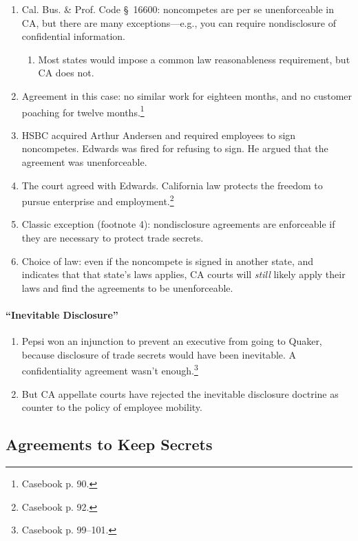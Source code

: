 \begin{enumerate}
    \item Cal. Bus. \& Prof. Code \S\ 16600: noncompetes are per se 
    unenforceable in CA, but there are many exceptions---e.g., you can require 
    nondisclosure of confidential information.
    \begin{enumerate}
        \item Most states would impose a common law reasonableness 
        requirement, but CA does not.
    \end{enumerate}
    \item Agreement in this case: no similar work for eighteen months, and no 
    customer poaching for twelve months.\footnote{Casebook p. 90.}
    \item HSBC acquired Arthur Andersen and required employees to sign 
    noncompetes. Edwards was fired for refusing to sign. He argued that the 
    agreement was unenforceable.
    \item The court agreed with Edwards. California law protects the freedom 
    to pursue enterprise and employment.\footnote{Casebook p. 92.}
    \item Classic exception (footnote 4): nondisclosure agreements are 
    enforceable if they are necessary to protect trade secrets.
    \item Choice of law: even if the noncompete is signed in another state, 
    and indicates that that state's laws applies, CA courts will \emph{still} 
    likely apply their laws and find the agreements to be unenforceable.
\end{enumerate}

\paragraph{``Inevitable Disclosure''}

\begin{enumerate}
    \item Pepsi won an injunction to prevent an executive from going to 
    Quaker, because disclosure of trade secrets would have been inevitable. A 
    confidentiality agreement wasn't enough.\footnote{Casebook p. 99--101.}
    \item But CA appellate courts have rejected the inevitable disclosure 
    doctrine as counter to the policy of employee mobility.
\end{enumerate}

\subsection{Agreements to Keep Secrets}

